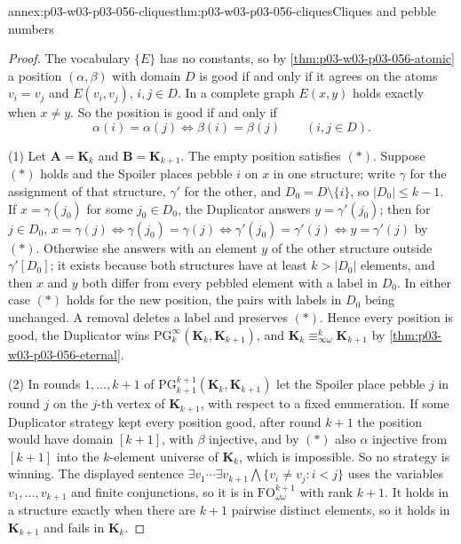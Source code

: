 \begin{annexitem}{annex:p03-w03-p03-056-cliques}{thm:p03-w03-p03-056-cliques}{Cliques and pebble numbers}
\begin{proof}
The vocabulary \(\{E\}\) has no constants, so by
\cref{thm:p03-w03-p03-056-atomic} a position \((\alpha,\beta)\) with domain
\(D\) is good if and only if it agrees on the atoms \(v_i=v_j\) and
\(E(v_i,v_j)\), \(i,j\in D\). In a complete graph \(E(x,y)\) holds exactly
when \(x\neq y\). So the position is good if and only if
\[
 \alpha(i)=\alpha(j)\iff\beta(i)=\beta(j)\qquad(i,j\in D).\tag{\(\ast\)}
\]

(1) Let \(\mathbf A=\mathbf K_k\) and \(\mathbf B=\mathbf K_{k+1}\). The
empty position satisfies \((\ast)\). Suppose \((\ast)\) holds and the
Spoiler places pebble \(i\) on \(x\) in one structure; write \(\gamma\) for
the assignment of that structure, \(\gamma'\) for the other, and
\(D_0=D\setminus\{i\}\), so \(\lvert D_0\rvert\leq k-1\). If
\(x=\gamma(j_0)\) for some \(j_0\in D_0\), the Duplicator answers
\(y=\gamma'(j_0)\); then for \(j\in D_0\),
\(x=\gamma(j)\iff\gamma(j_0)=\gamma(j)\iff\gamma'(j_0)=\gamma'(j)\iff
y=\gamma'(j)\) by \((\ast)\). Otherwise she answers with an element \(y\) of
the other structure outside \(\gamma'[D_0]\); it exists because both
structures have at least \(k>\lvert D_0\rvert\) elements, and then \(x\) and
\(y\) both differ from every pebbled element with a label in \(D_0\). In
either case \((\ast)\) holds for the new position, the pairs with labels in
\(D_0\) being unchanged. A removal deletes a label and preserves \((\ast)\).
Hence every position is good, the Duplicator wins
\(\mathrm{PG}^\infty_k(\mathbf K_k,\mathbf K_{k+1})\), and
\(\mathbf K_k\equiv^k_{\infty\omega}\mathbf K_{k+1}\) by
\cref{thm:p03-w03-p03-056-eternal}.

(2) In rounds \(1,\ldots,k+1\) of
\(\mathrm{PG}^{k+1}_{k+1}(\mathbf K_k,\mathbf K_{k+1})\) let the Spoiler place
pebble \(j\) in round \(j\) on the \(j\)-th vertex of \(\mathbf K_{k+1}\),
with respect to a fixed enumeration. If some Duplicator strategy kept every
position good, after round \(k+1\) the position would have domain
\([k+1]\), with \(\beta\) injective, and by \((\ast)\) also \(\alpha\)
injective from \([k+1]\) into the \(k\)-element universe of \(\mathbf K_k\),
which is impossible. So no strategy is winning. The displayed sentence
\(\exists v_1\cdots\exists v_{k+1}\bigwedge\{v_i\neq v_j:i<j\}\) uses the
variables \(v_1,\ldots,v_{k+1}\) and finite conjunctions, so it is in
\(\mathrm{FO}^{k+1}_{\omega\omega}\) with rank \(k+1\). It holds in a
structure exactly when there are \(k+1\) pairwise distinct elements, so it
holds in \(\mathbf K_{k+1}\) and fails in \(\mathbf K_k\).
\end{proof}
\end{annexitem}

